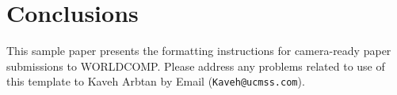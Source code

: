\documentclass[conference]{worldcomp}
\begin{document}
\section{Conclusions}\label{sec:conclusion}
This sample paper presents the formatting instructions for camera-ready paper 
submissions to WORLDCOMP.  Please address any problems related to use of this 
template to Kaveh Arbtan by Email (\texttt{Kaveh@ucmss.com}).

\end{document}
